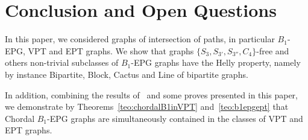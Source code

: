 \documentclass[9pt]{entcs}
\begin{document}


\section{Conclusion and Open Questions}

In this paper, we considered graphs of intersection of paths, in particular $B_1$-EPG, VPT and EPT graphs. We show that graphs $\{S_3, S_{3'},S_{3''},C_4\}$-free and others non-trivial subclasses of  $B_1$-EPG graphs have the Helly property, namely by instance Bipartite, Block, Cactus and Line of bipartite graphs. 
  
  In addition, combining the results of~\cite{alcon2014recognizing,Asinowski2009, golumbic2009} and some proves  presented in this paper, we demonstrate by  Theorems~\ref{teo:chordalB1inVPT} and~\ref{teo:b1epgept} that Chordal $B_1$-EPG graphs are simultaneously contained in the classes of VPT and EPT graphs.  
 
 
\end{document}
